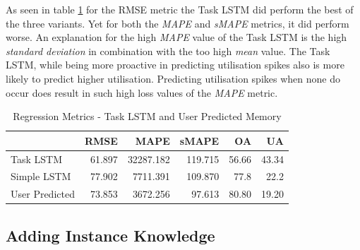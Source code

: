       As seen in table \ref{tab:regression-metrics-task-lstm-user-predicted-memory} for the RMSE metric the Task LSTM did perform the best of the three variants. Yet for both the \emph{MAPE} and \emph{sMAPE} metrics, it did perform worse. An explanation for the high \emph{MAPE} value of the Task LSTM is the high \emph{standard deviation} in combination with the too high \emph{mean} value. The Task LSTM, while being more proactive in predicting utilisation spikes also is more likely to predict higher utilisation. Predicting utilisation spikes when none do occur does result in such high loss values of the \emph{MAPE} metric.
      
      \begin{table}
        \centering
        \caption{Regression Metrics - Task LSTM and User Predicted Memory}
        \label{tab:regression-metrics-task-lstm-user-predicted-memory}
        
        \begin{tabular}{|l|rrrrr|}
          \toprule
          {} &    RMSE &       MAPE &    sMAPE &     OA &     UA \\
          \midrule
          Task LSTM   &  61.897 &  32287.182 &  119.715 &  56.66 &  43.34 \\
          Simple LSTM &  77.902 &  7711.391 &  109.870 &  77.8 &  22.2 \\
          User Predicted &  73.853 &   3672.256 &   97.613 &  80.80 &  19.20 \\
          \bottomrule
        \end{tabular}
      \end{table}

  \subsection{Adding Instance Knowledge}
  \label{sec:adding-instance-knowledge-evaluation-scenarios}

